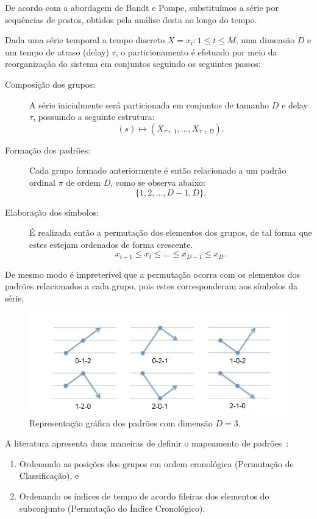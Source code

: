 De acordo com a abordagem de Bandt e Pompe, substituímos a série por sequências de postos, obtidos pela análise desta ao longo do tempo.

Dada uma série temporal a tempo discreto $X = {x_t:1\leq t\leq M}$, uma dimensão $D$ e um tempo de atraso (delay) $\tau$, o particionamento é efetuado por meio da reorganização do sistema em conjuntos seguindo os seguintes passos:
\begin{description}
\item[Composição dos grupos:] A série inicialmente será particionada em conjuntos de tamanho $D$ e delay $\tau$, possuindo a seguinte estrutura: 
		 $$(s) \mapsto (X_{\tau+1},\ldots, X_{\tau+D}).$$  

\item[Formação dos padrões:] Cada grupo formado anteriormente é então relacionado a um padrão ordinal $\pi$ de ordem $D$, como se observa abaixo:
		$$ \{1, 2,\ldots, D-1, D\}. $$

\item[Elaboração dos símbolos:] É realizada então a permutação dos elementos dos grupos, de tal forma que estes estejam ordenados de forma crescente.
		$$ x_{t+1} \leq x_{t} \leq ... \leq x_{D-1} \leq x_{D}. $$ 
\end{description}

De mesmo modo é impreterível que a permutação ocorra com os elementos dos padrões relacionados a cada grupo, pois estes corresponderam aos símbolos da série.

\begin{figure}[!ht]
	\begin{center}
		\includegraphics[width=0.7\columnwidth]{imagens/padroes.png}
        \caption{Representação gráfica dos padrões com dimensão $D=3$.}
	\end{center}
\end{figure}

A literatura apresenta duas maneiras de definir o mapeamento de padrões~\citep{tiedvalues}:  

\begin{enumerate}[label=(\alph*)]
\item Ordenando as posições dos grupos em ordem cronológica (Permutação de Classificação), e 
\item Ordenando os índices de tempo de acordo fileiras dos elementos do subconjunto (Permutação do Índice Cronológico).
\end{enumerate}

